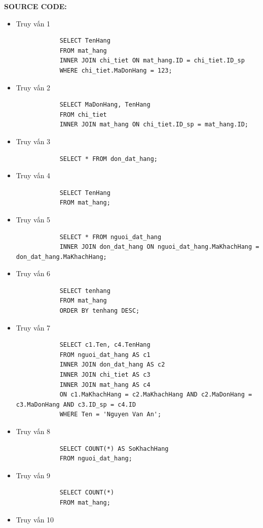 \documentclass[12pt,a4paper]{report}
\begin{document}
	{\bf SOURCE CODE:}
	\begin{itemize}
		\item Truy vấn 1
		\begin{lstlisting}
			SELECT TenHang
			FROM mat_hang
			INNER JOIN chi_tiet ON mat_hang.ID = chi_tiet.ID_sp
			WHERE chi_tiet.MaDonHang = 123;
		\end{lstlisting}
		\item Truy vấn 2
		\begin{lstlisting}
			SELECT MaDonHang, TenHang
			FROM chi_tiet
			INNER JOIN mat_hang ON chi_tiet.ID_sp = mat_hang.ID;
		\end{lstlisting}
		\item Truy vấn 3
		\begin{lstlisting}
			SELECT * FROM don_dat_hang;
		\end{lstlisting}
		\item Truy vấn 4
		\begin{lstlisting}
			SELECT TenHang
			FROM mat_hang;
		\end{lstlisting}
		\item Truy vấn 5
		\begin{lstlisting}
			SELECT * FROM nguoi_dat_hang
			INNER JOIN don_dat_hang ON nguoi_dat_hang.MaKhachHang = don_dat_hang.MaKhachHang;
		\end{lstlisting}
		\item Truy vấn 6
		\begin{lstlisting}
			SELECT tenhang
			FROM mat_hang
			ORDER BY tenhang DESC;
		\end{lstlisting}
		\item Truy vấn 7
		\begin{lstlisting}
			SELECT c1.Ten, c4.TenHang
			FROM nguoi_dat_hang AS c1
			INNER JOIN don_dat_hang AS c2
			INNER JOIN chi_tiet AS c3
			INNER JOIN mat_hang AS c4
			ON c1.MaKhachHang = c2.MaKhachHang AND c2.MaDonHang = c3.MaDonHang AND c3.ID_sp = c4.ID
			WHERE Ten = 'Nguyen Van An';
		\end{lstlisting}
		\item Truy vấn 8
		\begin{lstlisting}
			SELECT COUNT(*) AS SoKhachHang
			FROM nguoi_dat_hang;
		\end{lstlisting}
		\item Truy vấn 9
		\begin{lstlisting}
			SELECT COUNT(*)
			FROM mat_hang;
		\end{lstlisting}
		\item Truy vấn 10
		\begin{lstlisting}

\end{lstlisting}
\end{itemize}
\end{document}
